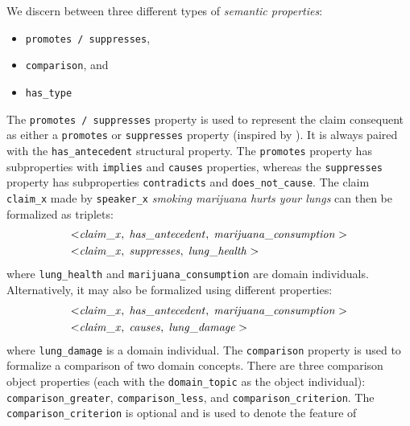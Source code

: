 We discern between three different types of \emph{semantic properties}:
\begin{itemize}
\item \texttt{promotes / suppresses},
\item \texttt{comparison}, and
\item \texttt{has\_type}
\end{itemize}
The \texttt{promotes / suppresses} property is used to represent the claim
consequent as either a \texttt{promotes} or \texttt{suppresses} property
(inspired by \citet{hashimoto2012excitatory}). It is always paired with
the \texttt{has\_antecedent} structural property. The \texttt{promotes}
property has subproperties with \texttt{implies} and \texttt{causes}
properties, whereas the \texttt{suppresses} property has 
subproperties \texttt{contradicts} and \texttt{does\_not\_cause}.
The claim \texttt{claim\_x} made by \texttt{speaker\_x}
\emph{smoking marijuana hurts your lungs} can then be formalized as triplets:
\begin{align*}
	< & \mathit{claim\_x}, \hspace{0.1cm} \mathit{has\_antecedent}, \hspace{0.1cm}
	\mathit{marijuana\_consumption} > \\
	< & \mathit{claim\_x}, \hspace{0.1cm} \mathit{suppresses}, \hspace{0.1cm}
	\mathit{lung\_health} > 
\end{align*}
where \texttt{lung\_health} and \texttt{marijuana\_consumption} are 
domain individuals. 
Alternatively, it may also be formalized using different properties:
\begin{align*}
	< & \mathit{claim\_x}, \hspace{0.1cm} \mathit{has\_antecedent}, \hspace{0.1cm}
	\mathit{marijuana\_consumption} > \\
	< & \mathit{claim\_x}, \hspace{0.1cm} \mathit{causes}, \hspace{0.1cm}
	\mathit{lung\_damage} > 
\end{align*}
where \texttt{lung\_damage} is a domain individual. 
The \texttt{comparison} property is used to formalize a comparison of 
two domain concepts. There are three comparison object properties (each with the
\texttt{domain\_topic} as the object individual): \texttt{comparison\_greater},
\texttt{comparison\_less}, and \texttt{comparison\_criterion}. The
\texttt{comparison\_criterion} is optional and is used to denote the feature of 

